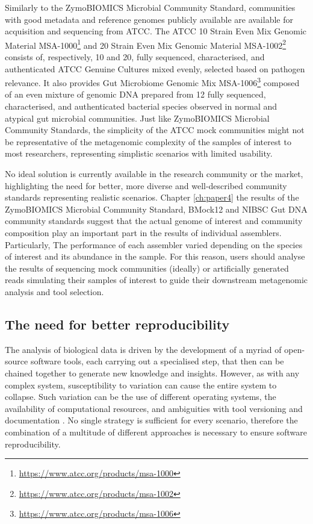 Similarly to the ZymoBIOMICS Microbial Community Standard, communities with good metadata and reference genomes publicly available are available for acquisition and sequencing from \ac{ATCC}. The \ac{ATCC} 10 Strain Even Mix Genomic Material MSA-1000\footnote{\url{https://www.atcc.org/products/msa-1000}} and 20 Strain Even Mix Genomic Material MSA-1002\footnote{\url{https://www.atcc.org/products/msa-1002}} consists of, respectively, 10 and 20, fully sequenced, characterised, and authenticated \ac{ATCC} Genuine Cultures mixed evenly, selected based on pathogen relevance. It also provides Gut Microbiome Genomic Mix MSA-1006\footnote{\url{https://www.atcc.org/products/msa-1006}} composed of an even mixture of genomic DNA prepared from 12 fully sequenced, characterised, and authenticated bacterial species observed in normal and atypical gut microbial communities. Just like ZymoBIOMICS Microbial Community Standards, the simplicity of the ATCC mock communities might not be representative of the metagenomic complexity of the samples of interest to most researchers, representing simplistic scenarios with limited usability.

No ideal solution is currently available in the research community or the market, highlighting the need for better, more diverse and well-described community standards representing realistic scenarios. Chapter \ref{ch:paper4} the results of the ZymoBIOMICS Microbial Community Standard, BMock12 and NIBSC Gut DNA community standards suggest that the actual genome of interest and community composition play an important part in the results of individual assemblers. Particularly, The performance of each assembler varied depending on the species of interest and its abundance in the sample. For this reason, users should analyse the results of sequencing mock communities (ideally) or artificially generated reads simulating their samples of interest to guide their downstream metagenomic analysis and tool selection.


\subsection{The need for better reproducibility}

The analysis of biological data is driven by the development of a myriad of open-source software tools, each carrying out a specialised step, that then can be chained together to generate new knowledge and insights. However, as with any complex system, susceptibility to variation can cause the entire system to collapse. Such variation can be the use of different operating systems, the availability of computational resources, and ambiguities with tool versioning and documentation \citep{wratten_reproducible_2021, mangul_challenges_2019}. No single strategy is sufficient for every scenario, therefore the combination of a multitude of different approaches is necessary to ensure software reproducibility. 

